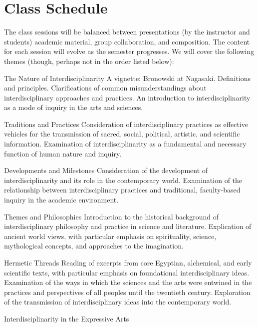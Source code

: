 \documentclass[letterpaper,10pt,headsepline]{scrreprt}
\begin{document}
\section{Class Schedule}
The class sessions will be balanced between presentations (by the instructor and students) academic material, group collaboration, and composition. The content for each session will evolve as the semester progresses. We will cover the following themes (though, perhaps not in the order listed below):
\\
\begin{compactdesc}

\item[The Nature of Interdisciplinarity]
A vignette: Bronowski at Nagasaki.
Definitions and principles.
Clarifications of common misunderstandings about interdisciplinary approaches and practices.
An introduction to interdisciplinarity as a mode of inquiry in the arts and sciences.
\\
\item[Traditions and Practices]
Consideration of interdisciplinary practices as effective vehicles for the transmission of  sacred, social, political, artistic, and scientific information.
Examination of interdisciplinarity as a fundamental and necessary function of human nature and inquiry.
\\
\item[Developments and Milestones]
Consideration of the development of interdisciplinarity and its role in the contemporary world.
Examination of the relationship between interdisciplinary practices and traditional, faculty-based inquiry in the academic environment.
\\	
\item[Themes and Philosophies]
Introduction to the historical background of interdisciplinary philosophy and practice in science and literature.
Explication of ancient world views, with particular emphasis on spirituality, science, mythological concepts, and approaches to the imagination.
\\
\item[Hermetic Threads]
Reading of excerpts from core Egyptian, alchemical, and early scientific texts, with particular emphasis on foundational interdisciplinary ideas.
Examination of the ways in which the sciences and the arts were entwined in the practices and perspectives of all peoples until the twentieth century.
Exploration of the transmission of interdisciplinary ideas into the contemporary world.
\\
\item[Interdisciplinarity in the Expressive Arts]

\end{compactdesc}
\end{document}
